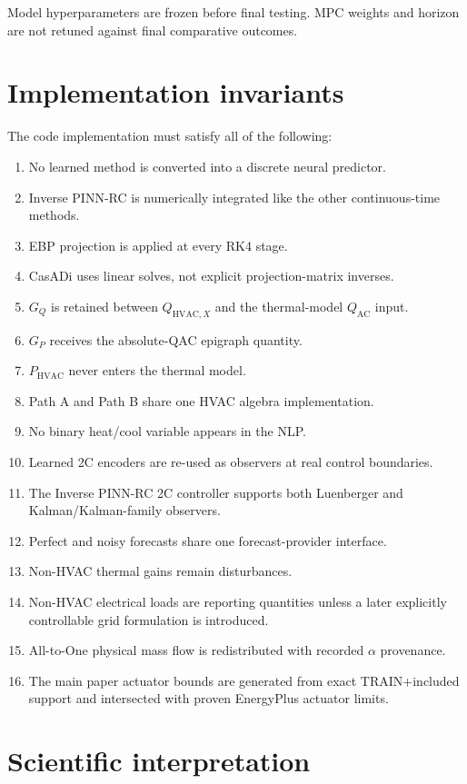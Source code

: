 \documentclass[11pt]{article}
\newcommand{\QAC}{Q_{\mathrm{AC}}}
\newcommand{\QHX}{Q_{\mathrm{HVAC},X}}
\newcommand{\PHVAC}{P_{\mathrm{HVAC}}}
\begin{document}
Model hyperparameters are frozen before final testing.  MPC weights and horizon are not retuned
against final comparative outcomes.

\section{Implementation invariants}

The code implementation must satisfy all of the following:

\begin{enumerate}[leftmargin=2em]
\item No learned method is converted into a discrete neural predictor.
\item Inverse PINN-RC is numerically integrated like the other continuous-time methods.
\item EBP projection is applied at every RK4 stage.
\item CasADi uses linear solves, not explicit projection-matrix inverses.
\item \(G_Q\) is retained between \(\QHX\) and the thermal-model \(\QAC\) input.
\item \(G_P\) receives the absolute-QAC epigraph quantity.
\item \(\PHVAC\) never enters the thermal model.
\item Path A and Path B share one HVAC algebra implementation.
\item No binary heat/cool variable appears in the NLP.
\item Learned 2C encoders are re-used as observers at real control boundaries.
\item The Inverse PINN-RC 2C controller supports both Luenberger and Kalman/Kalman-family observers.
\item Perfect and noisy forecasts share one forecast-provider interface.
\item Non-HVAC thermal gains remain disturbances.
\item Non-HVAC electrical loads are reporting quantities unless a later explicitly controllable
grid formulation is introduced.
\item All-to-One physical mass flow is redistributed with recorded \(\alpha\) provenance.
\item The main paper actuator bounds are generated from exact TRAIN+included support and intersected
with proven EnergyPlus actuator limits.
\end{enumerate}

\section{Scientific interpretation}
\end{document}
